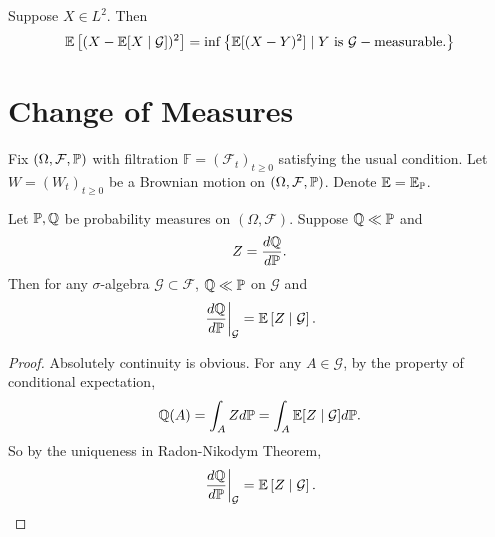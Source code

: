 \begin{exam}
    Suppose $X \in L^2$. Then
    \begin{equation*}
    	\mathbb{E}\left[(X-\mathbb{E}[X \mid \mathcal{G}])^2\right] = \inf \left\{ \mathbb{E}[(X-Y)^2] \mid Y \text{ is } \mathcal{G}-\text{measurable.}\right\}
    \end{equation*}
\end{exam}

\section{Change of Measures}

Fix $(\Omega,\mathcal{F},\mathbb{P})$ with filtration $\mathbb{F} = (\mathcal{F}_t)_{t \geq 0}$ satisfying the usual condition. Let $W=(W_t)_{t \geq 0}$ be a Brownian motion on $(\Omega,\mathcal{F},\mathbb{P})$. Denote $\mathbb{E} = \mathbb{E}_{\mathbb{P}}$.

\begin{prop}
    Let $\mathbb{P},\mathbb{Q}$ be probability measures on $(\Omega,\mathcal{F})$. Suppose $\mathbb{Q} \ll \mathbb{P}$ and
    \begin{equation*}
        Z = \frac{d\mathbb{Q}}{d\mathbb{P}}.
    \end{equation*}
    Then for any $\sigma$-algebra $\mathcal{G} \subset \mathcal{F}$, $\mathbb{Q} \ll \mathbb{P}$ on $\mathcal{G}$ and
    \begin{equation*}
        \left.\frac{d\mathbb{Q}}{d\mathbb{P}}\right\lvert_\mathcal{G} = \mathbb{E}\left[Z \mid \mathcal{G}\right].
    \end{equation*}
\end{prop}
\begin{proof}
    Absolutely continuity is obvious. For any $A \in \mathcal{G}$, by the property of conditional expectation,
    \begin{equation*}
        \mathbb{Q}(A) = \int_A Z d\mathbb{P} = \int_A \mathbb{E}[Z \mid \mathcal{G}]d\mathbb{P}.
    \end{equation*}
    So by the uniqueness in Radon-Nikodym Theorem,
    \begin{equation*}
        \left.\frac{d\mathbb{Q}}{d\mathbb{P}}\right\lvert_\mathcal{G} = \mathbb{E}\left[Z \mid \mathcal{G}\right]. \qedhere
    \end{equation*}
\end{proof}

